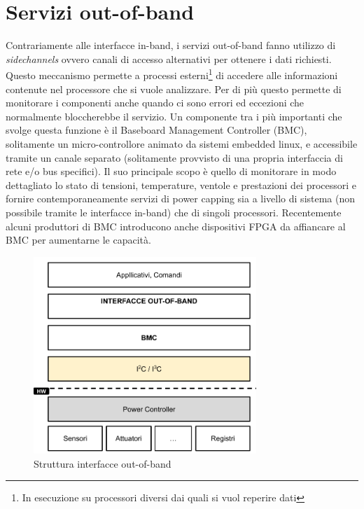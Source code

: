 \section{Servizi out-of-band}
Contrariamente alle interfacce in-band, i servizi out-of-band fanno utilizzo di \emph{sidechannels} ovvero canali di accesso alternativi per ottenere i dati richiesti. Questo meccanismo permette a processi esterni\footnote{In esecuzione su processori diversi dai quali si vuol reperire dati} di accedere alle informazioni contenute nel processore che si vuole analizzare. Per di più questo permette di monitorare i componenti anche quando ci sono errori ed eccezioni che normalmente bloccherebbe il servizio. Un componente tra i più importanti che svolge questa funzione è il Baseboard Management Controller (BMC), solitamente un micro-controllore animato da sistemi embedded linux, e accessibile tramite un canale separato (solitamente provvisto di una propria interfaccia di rete e/o bus specifici). Il suo principale scopo è quello di monitorare in modo dettagliato lo stato di tensioni, temperature, ventole e prestazioni dei processori e fornire contemporaneamente servizi di power capping sia a livello di sistema (non possibile tramite le interfacce in-band) che di singoli processori.
Recentemente alcuni produttori di BMC introducono anche dispositivi FPGA da affiancare al BMC per aumentarne le capacità.
\begin{figure}[H]
    \centering
    \includegraphics[width=0.75\textwidth]{img/out-of-band.png}
    \caption{Struttura interfacce out-of-band} 
    \label{fig:out-of-band}
\end{figure}


